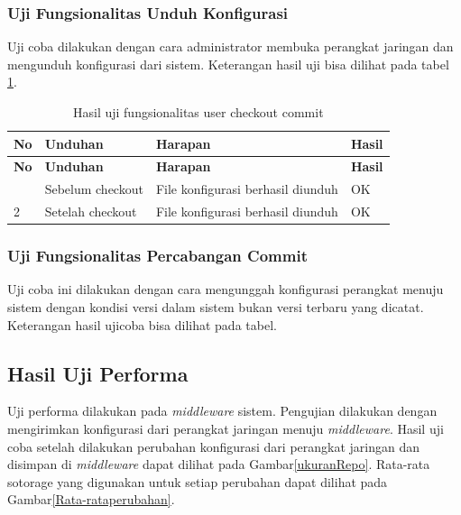 	\subsubsection{Uji Fungsionalitas Unduh Konfigurasi}
	Uji coba dilakukan dengan cara administrator membuka perangkat jaringan dan mengunduh konfigurasi dari sistem. Keterangan hasil uji bisa dilihat pada tabel \ref{hasilUnduhKonfig}.
	\begin{longtable}{|p{}|p{}|p{}|p{}|}
		
		\caption{Hasil uji fungsionalitas user checkout commit} \label{hasilUnduhKonfig} \\
		\hline
		\textbf{No} & \textbf{Unduhan} & \textbf{Harapan} & \textbf{Hasil} \\ \hline
		\endfirsthead
		\hline
		\textbf{No} & \textbf{Unduhan} & \textbf{Harapan} & \textbf{Hasil} \\ \hline
		\endhead
		\endfoot
		\endlastfoot
		1 & Sebelum checkout & File konfigurasi berhasil diunduh & OK\\ \hline
		2 & Setelah checkout & File konfigurasi berhasil diunduh & OK\\ \hline
		
	\end{longtable}
	
	
	\subsubsection{Uji Fungsionalitas Percabangan Commit}
	Uji coba ini dilakukan dengan cara mengunggah konfigurasi perangkat menuju sistem dengan kondisi versi dalam sistem bukan versi terbaru yang dicatat. Keterangan hasil ujicoba bisa dilihat pada tabel.
	
   	
    \subsection{Hasil Uji Performa}
    Uji performa dilakukan pada \textit{middleware} sistem. Pengujian dilakukan dengan mengirimkan konfigurasi dari perangkat jaringan menuju \textit{middleware}. Hasil uji coba setelah dilakukan perubahan konfigurasi dari perangkat jaringan dan disimpan di \textit{middleware} dapat dilihat pada Gambar\ref{ukuranRepo}. Rata-rata sotorage yang digunakan untuk setiap perubahan dapat dilihat pada Gambar\ref{Rata-rataperubahan}.
    	
